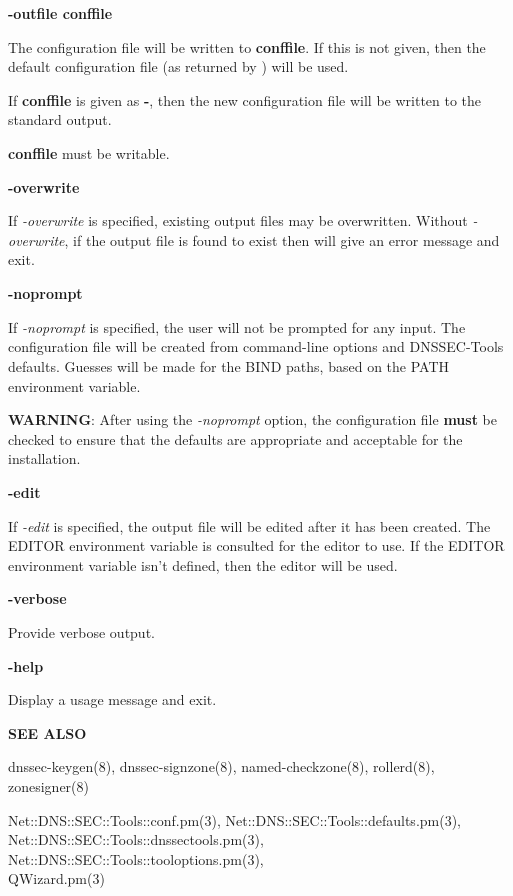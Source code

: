 \begin{description}

\item {\bf -outfile conffile}\verb" "

The configuration file will be written to {\bf conffile}.  If this is
not given, then the default configuration file (as returned by
) will be used.

If {\bf conffile} is given as {\bf -}, then the new configuration file will be
written to the standard output.

{\bf conffile} must be writable.

\item {\bf -overwrite}\verb" "

If {\it -overwrite} is specified, existing output files may be overwritten.
Without {\it -overwrite}, if the output file is found to exist then
 will give an error message and exit.

\item {\bf -noprompt}\verb" "

If {\it -noprompt} is specified, the user will not be prompted for any input.
The configuration file will be created from command-line options and
DNSSEC-Tools defaults.  Guesses will be made for the BIND paths, based on
the PATH environment variable.

{\bf WARNING}:  After using the {\it -noprompt} option, the configuration file
{\bf must} be checked to ensure that the defaults are appropriate and acceptable
for the installation.

\item {\bf -edit}\verb" "

If {\it -edit} is specified, the output file will be edited after it has been
created.  The EDITOR environment variable is consulted for the editor to
use.  If the EDITOR environment variable isn't defined, then the 
editor will be used.

\item {\bf -verbose}\verb" "

Provide verbose output.

\item {\bf -help}\verb" "

Display a usage message and exit.

\end{description}

{\bf SEE ALSO}

dnssec-keygen(8),
dnssec-signzone(8),
named-checkzone(8),
rollerd(8),
zonesigner(8)

Net::DNS::SEC::Tools::conf.pm(3),
Net::DNS::SEC::Tools::defaults.pm(3),\\
Net::DNS::SEC::Tools::dnssectools.pm(3),
Net::DNS::SEC::Tools::tooloptions.pm(3),\\
QWizard.pm(3)

